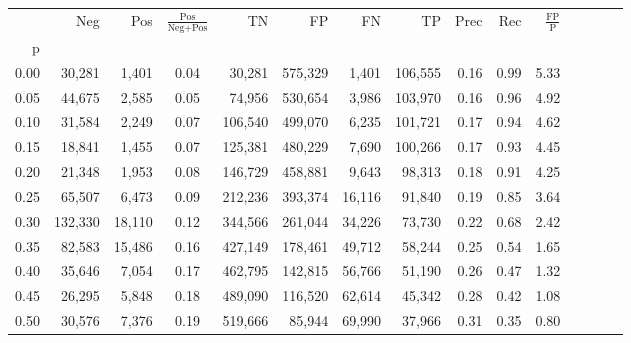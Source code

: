 \begin{tabular}{rrrcrrrrrrrrrrr}
\toprule
{} &      Neg &     Pos & $\frac{\text{Pos}}{\text{Neg}+\text{Pos}}$ &       TN &       FP &       FN &       TP &  Prec &   Rec & $\frac{\text{FP}}{\text{P}}$ \\
p    &          &         &                                            &          &          &          &          &       &       &                              \\
\midrule
0.00 &   30,281 &   1,401 &                                       0.04 &   30,281 &  575,329 &    1,401 &  106,555 &  0.16 &  0.99 &                         5.33 \\
0.05 &   44,675 &   2,585 &                                       0.05 &   74,956 &  530,654 &    3,986 &  103,970 &  0.16 &  0.96 &                         4.92 \\
0.10 &   31,584 &   2,249 &                                       0.07 &  106,540 &  499,070 &    6,235 &  101,721 &  0.17 &  0.94 &                         4.62 \\
0.15 &   18,841 &   1,455 &                                       0.07 &  125,381 &  480,229 &    7,690 &  100,266 &  0.17 &  0.93 &                         4.45 \\
0.20 &   21,348 &   1,953 &                                       0.08 &  146,729 &  458,881 &    9,643 &   98,313 &  0.18 &  0.91 &                         4.25 \\
0.25 &   65,507 &   6,473 &                                       0.09 &  212,236 &  393,374 &   16,116 &   91,840 &  0.19 &  0.85 &                         3.64 \\
0.30 &  132,330 &  18,110 &                                       0.12 &  344,566 &  261,044 &   34,226 &   73,730 &  0.22 &  0.68 &                         2.42 \\
0.35 &   82,583 &  15,486 &                                       0.16 &  427,149 &  178,461 &   49,712 &   58,244 &  0.25 &  0.54 &                         1.65 \\
0.40 &   35,646 &   7,054 &                                       0.17 &  462,795 &  142,815 &   56,766 &   51,190 &  0.26 &  0.47 &                         1.32 \\
0.45 &   26,295 &   5,848 &                                       0.18 &  489,090 &  116,520 &   62,614 &   45,342 &  0.28 &  0.42 &                         1.08 \\
0.50 &   30,576 &   7,376 &                                       0.19 &  519,666 &   85,944 &   69,990 &   37,966 &  0.31 &  0.35 &                         0.80 \\

\end{tabular}
